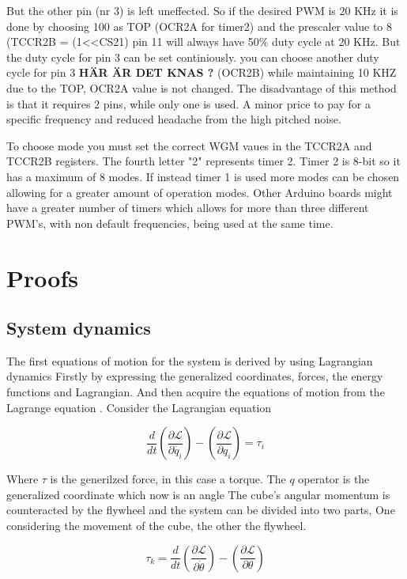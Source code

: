 \documentclass[a4paper,11pt]{kth-mag}
\begin{document}
But the other pin (nr 3) is left uneffected. So if the desired PWM is 20 KHz it is done by choosing 100 
as TOP (OCR2A for timer2) and the prescaler value to 8 (TCCR2B = (1<<CS21) pin 11 will always have 50\% duty cycle at 20 KHz. But the duty cycle for pin 3 can be set continiously.  you can choose another duty cycle for pin 3  \textbf{HÄR ÄR DET KNAS ?}
(OCR2B) while maintaining 10 KHZ due to the TOP, OCR2A value is not changed. The disadvantage of this method is that it requires 2 pins, while only one is used. A minor price to pay for a specific frequency and reduced headache from the high pitched noise.

To choose mode you must set the correct WGM vaues in the TCCR2A and TCCR2B registers. The fourth letter "2" represents timer 2. Timer 2 is 8-bit so it has a maximum of 8 modes. If instead timer 1 is 
used more modes can be chosen allowing for a greater amount of operation modes. Other Arduino boards might have a greater number of timers which allows for more than three different PWM's, with non default frequencies, being used at the same time.

\chapter{Proofs} \label{appB}

\section{System dynamics} \label{app: system dyn}
The first equations of motion for the system is derived by using Lagrangian dynamics Firstly by expressing the generalized coordinates, forces, the energy functions and Lagrangian. And then acquire the equations of motion from the Lagrange equation  \cite{Lagrangeref}. Consider the Lagrangian equation

\begin{equation}
\frac{d}{dt}\left(\frac{\partial \mathcal{L}}{\partial \dot{q_i}}\right)-\left(\frac{\partial \mathcal{L}}{\partial q_i}\right) = \tau_i
\end{equation}

Where $\tau$ is the generilzed force, in this case a torque. The $q$ operator is the generalized coordinate which now is an angle The cube's angular momentum is counteracted by the flywheel and the system can be divided into two parts, One considering the movement of the cube, the other the flywheel.

\begin{equation} \label{eq:positiveL}
\tau_k=\frac{d}{dt}\left(\frac{\partial \mathcal{L}}{\partial \dot{\theta}}\right)-\left(\frac{\partial \mathcal{L}}{\partial \theta}\right)
\end{equation}
\end{document}
